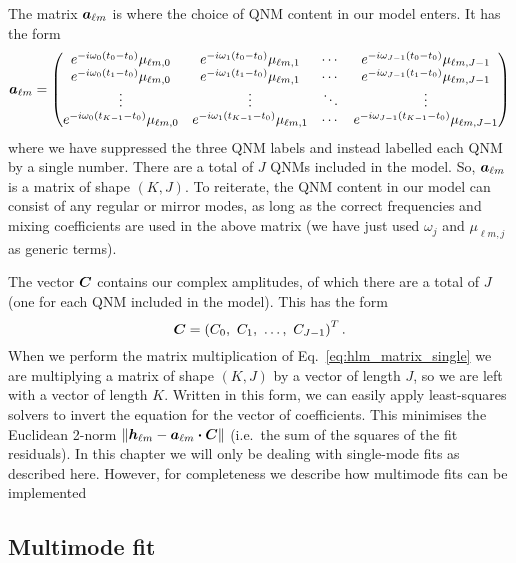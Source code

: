 The matrix $\vb*{a}_{\ell m}$ is where the choice of QNM content in our model enters. 
It has the form
\begin{equation}
    \vb*{a}_{\ell m} = 
    \begin{pmatrix}
    e^{-i \omega_0 (t_0 - t_0)} \mu_{\ell m,0} & e^{-i \omega_1 (t_0 - t_0)} \mu_{\ell m,1} & \cdots & e^{-i \omega_{J-1} (t_0 - t_0)} \mu_{\ell m,J-1} \\ 
    e^{-i \omega_0 (t_1 - t_0)} \mu_{\ell m,0} & e^{-i \omega_1 (t_1 - t_0)} \mu_{\ell m,1} & \cdots & e^{-i \omega_{J-1} (t_1 - t_0)} \mu_{\ell m,J-1} \\ 
    \vdots & \vdots & \ddots & \vdots \\
    e^{-i \omega_0 (t_{K-1} - t_0)} \mu_{\ell m,0} & e^{-i \omega_1 (t_{K-1} - t_0)} \mu_{\ell m,1} & \cdots & e^{-i \omega_{J-1} (t_{K-1} - t_0)} \mu_{\ell m,J-1}
    \end{pmatrix}
\end{equation}
where we have suppressed the three QNM labels and instead labelled each QNM by a single number. 
There are a total of $J$ QNMs included in the model.
So, $\vb*{a}_{\ell m}$ is a matrix of shape $(K, J)$.
To reiterate, the QNM content in our model can consist of any regular or mirror modes, as long as the correct frequencies and mixing coefficients are used in the above matrix (we have just used $\omega_j$ and $\mu_{\ell m, j}$ as generic terms). 

The vector $\vb*{C}$ contains our complex amplitudes, of which there are a total of $J$ (one for each QNM included in the model). This has the form
\begin{equation}
    \vb*{C} = \left(C_0,\ C_1,\ \ldots,\ C_{J-1}\right)^T.
\end{equation}
When we perform the matrix multiplication of Eq.~\ref{eq:hlm_matrix_single} we are multiplying a matrix of shape $(K,J)$ by a vector of length $J$, so we are left with a vector of length $K$.
Written in this form, we can easily apply least-squares solvers to invert the equation for the vector of coefficients. 
This minimises the Euclidean 2-norm $\norm{\vb*{h}_{\ell m} - \vb*{a}_{\ell m} \vdot \vb*{C}}$ (i.e.\ the sum of the squares of the fit residuals).
In this chapter we will only be dealing with single-mode fits as described here.
However, for completeness we describe how multimode fits can be implemented %

\subsection{Multimode fit}

